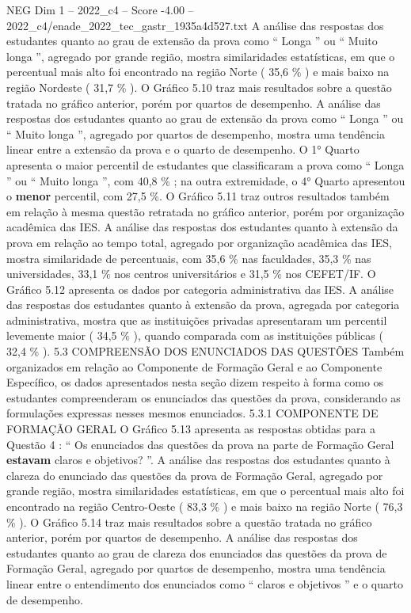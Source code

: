 \begin{textsample}{NEG Dim 1 – 2022\_c4 – Score -4.00 – 2022\_c4/enade\_2022\_tec\_gastr\_1935a4d527.txt}
A análise das respostas dos estudantes quanto ao grau de extensão da prova como “ Longa ” ou “ Muito longa ”, agregado por grande região, mostra similaridades estatísticas, em que o percentual mais alto foi encontrado na região Norte ( 35,6 \% ) e mais baixo na região Nordeste ( 31,7 \% ).
O Gráfico 5.10 traz mais resultados sobre a questão tratada no gráfico anterior, porém por quartos de desempenho.
A análise das respostas dos estudantes quanto ao grau de extensão da prova como “ Longa ” ou “ Muito longa ”, agregado por quartos de desempenho, mostra uma tendência linear entre a extensão da prova e o quarto de desempenho.
O 1{\EmojiFont °} Quarto apresenta o maior percentil de estudantes que classificaram a prova como “ Longa ” ou “ Muito longa ”, com 40,8 \% ; na outra extremidade, o 4{\EmojiFont °} Quarto apresentou o \textbf{menor} percentil, com 27,5 \%.
O Gráfico 5.11 traz outros resultados também em relação à mesma questão retratada no gráfico anterior, porém por organização acadêmica das IES.
A análise das respostas dos estudantes quanto à extensão da prova em relação ao tempo total, agregado por organização acadêmica das IES, mostra similaridade de percentuais, com 35,6 \% nas faculdades, 35,3 \% nas universidades, 33,1 \% nos centros universitários e 31,5 \% nos CEFET/IF.
O Gráfico 5.12 apresenta os dados por categoria administrativa das IES.
A análise das respostas dos estudantes quanto à extensão da prova, agregada por categoria administrativa, mostra que as instituições privadas apresentaram um percentil levemente maior ( 34,5 \% ), quando comparada com as instituições públicas ( 32,4 \% ). 5.3 COMPREENSÃO DOS ENUNCIADOS DAS QUESTÕES Também organizados em relação ao Componente de Formação Geral e ao Componente Específico, os dados apresentados nesta seção dizem respeito à forma como os estudantes compreenderam os enunciados das questões da prova, considerando as formulações expressas nesses mesmos enunciados. 5.3.1 COMPONENTE DE FORMAÇÃO GERAL O Gráfico 5.13 apresenta as respostas obtidas para a Questão 4 : “ Os enunciados das questões da prova na parte de Formação Geral \textbf{estavam} claros e objetivos? ”.
A análise das respostas dos estudantes quanto à clareza do enunciado das questões da prova de Formação Geral, agregado por grande região, mostra similaridades estatísticas, em que o percentual mais alto foi encontrado na região Centro-Oeste ( 83,3 \% ) e mais baixo na região Norte ( 76,3 \% ).
O Gráfico 5.14 traz mais resultados sobre a questão tratada no gráfico anterior, porém por quartos de desempenho.
A análise das respostas dos estudantes quanto ao grau de clareza dos enunciados das questões da prova de Formação Geral, agregado por quartos de desempenho, mostra uma tendência linear entre o entendimento dos enunciados como “ claros e objetivos ” e o quarto de desempenho.

\end{textsample}
